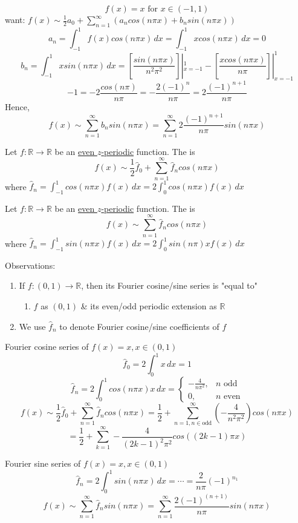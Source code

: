 \begin{example}
    \[f(x) = x \text{ for } x \in (-1,1)\]
    want: $f(x)\sim \frac{1}{2}a_0 +\sum_{n=1}^{\infty} (a_n cos(n\pi x) + b_n sin(n\pi x))$
    \[a_n = \int_{-1}^{1}f(x)cos(n\pi x)  \,dx = \int_{-1}^{1} x cos(n\pi x) \,dx =0\]
    \[b_n = \int_{-1}^{1}xsin(n\pi x)  \,dx = [\frac{sin(n\pi x)}{n^2 \pi^2}]|^1_{x=-1} - [\frac{xcos(n\pi x)}{n\pi}]|^1_{x=-1}\]
    \[-1 = -2\frac{cos(n\pi)}{n\pi}= -\frac{2(-1)^n}{n\pi} = 2\frac{(-1)^{n+1}}{n\pi}\]
    Hence, 
    \[f(x) \sim \sum_{n=1}^{\infty}b_n sin(n\pi x) = \boxed{\sum_{n=1}^{\infty} 2\frac{(-1)^{n+1}}{n\pi}sin(n\pi x)}\]
\end{example}

\begin{definition}
    Let $f: \mathbb{R} \rightarrow\mathbb{R} $ be an \underline{even $z$-periodic} function. The  is
    \[f(x) \sim \frac{1}{2}\hat{f}_0 + \sum_{n=1}^{\infty} \hat{f}_n cos(n\pi x)\]
    where $\hat{f}_n = \int_{-1}^{1} cos(n\pi x)f(x) \,dx = 2\int_{0}^{1} cos(n\pi x)f(x)  \,dx  $
    
    Let $f: \mathbb{R} \rightarrow\mathbb{R} $ be an \underline{even $z$-periodic} function. The  is
    \[f(x) \sim \sum_{n=1}^{\infty} \hat{f}_n cos(n\pi x)\]
    where $\hat{f}_n = \int_{-1}^{1} sin(n\pi x)f(x) \,dx = 2\int_{0}^{1}sin(n\pi)x f(x)  \,dx $
\end{definition}
Observations:
\begin{enumerate}
    \item If $f:(0,1) \rightarrow \mathbb{R}$, then its Fourier cosine/sine series is "equal to"
    \begin{enumerate}[label = (\roman*)]
        \item $f$ as $(0,1)$ \& its even/odd periodic extension as $\mathbb{R} $
    \end{enumerate}
    \item We use $\hat{f}_n$ to denote Fourier cosine/sine coefficients of $f$
\end{enumerate}
\begin{example}
    Fourier cosine series of $f(x) = x, x \in (0,1)$
    \[\hat{f}_0 = 2\int_{0}^{1} x \,dx =1 \]
    \[\hat{f}_n = 2\int_{0}^{1}cos(n\pi x)x  \,dx = \begin{cases}
        -\frac{4}{n\pi^2}, & n \text{ odd} \\
        0, & n \text{ even}
    \end{cases} \]
    \[f(x) \sim \frac{1}{2}\hat{f}_0 + \sum_{n=1}^{\infty} \hat{f}_n cos(n \pi x) = \frac{1}{2} + \sum_{n=1, n\in \text{odd}}^{\infty}(-\frac{4}{n^2\pi^2}) cos (n\pi x)\]
    \[= \frac{1}{2} + \sum_{k=1}^{\infty} - \frac{4}{(2k-1)^2 \pi^2} cos((2k-1)\pi x)\]
\end{example}
\begin{example}
    Fourier sine series of $f(x) = x, x\in(0,1)$
    \[\hat{f}_n = 2\int_{0}^{1}sin(n\pi x)  \,dx = \cdots = \frac{2}{n\pi}(-1)^{n_1} \]
    \[f(x) \sim \sum_{n=1}^{\infty} \hat{f}_n sin(n\pi x) = \sum_{n=1}^{\infty} \frac{2(-1)^(n+1)}{n\pi}sin(n\pi x)\]
\end{example}

